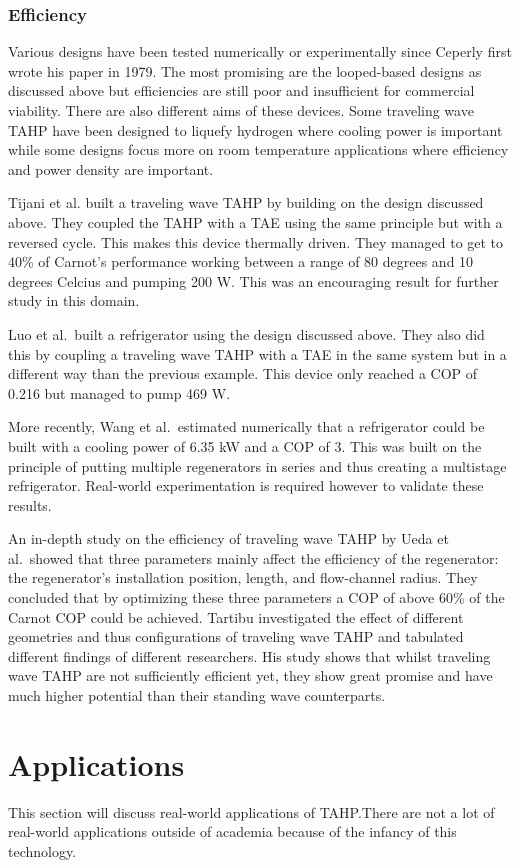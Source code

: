 \documentclass{article}
\newcommand{\newpara}
    {
      \bigbreak{}
      \noindent
    }
\begin{document}
\subsubsection{Efficiency}
Various designs have been tested numerically or experimentally since Ceperly first wrote his paper in 1979. The most promising are the looped-based designs as discussed above but efficiencies are still poor and insufficient for commercial viability. There are also different aims of these devices. Some traveling wave TAHP have been designed to liquefy hydrogen where cooling power is important while some designs focus more on room temperature applications where efficiency and power density are important\cite{WangRoomTemperature}.
\newpara{}
Tijani et al.\cite{spoelstraHighTemperature} built a traveling wave TAHP by building on the design discussed above. They coupled the TAHP with a TAE using the same principle but with a reversed cycle. This makes this device thermally driven. They managed to get to 40\% of Carnot's performance working between a range of 80 degrees and 10 degrees Celcius and pumping 200 W. This was an encouraging result for further study in this domain.
\newpara{}
Luo et al.\ built a refrigerator using the design discussed above\cite{LuoRefrigerator}. They also did this by coupling a traveling wave TAHP with a TAE in the same system but in a different way than the previous example. This device only reached a COP of 0.216 but managed to pump 469 W.
\newpara{}
More recently, Wang et al.\ estimated numerically that a refrigerator could be built with a cooling power of 6.35 kW and a COP of 3. This was built on the principle of putting multiple regenerators in series and thus creating a multistage refrigerator. Real-world experimentation is required however to validate these results.
\newpara{}
An in-depth study on the efficiency of traveling wave TAHP by Ueda et al.\ showed that three parameters mainly affect the efficiency of the regenerator: the regenerator's installation position, length, and flow-channel radius\cite{uedaOptimization}. They concluded that by optimizing these three parameters a COP of above 60\% of the Carnot COP could be achieved. Tartibu investigated the effect of different geometries and thus configurations of traveling wave TAHP and tabulated different findings of different researchers\cite{TARTIBU2019102}. His study shows that whilst traveling wave TAHP are not sufficiently efficient yet, they show great promise and have much higher potential than their standing wave counterparts.

\section{Applications}
This section will discuss real-world applications of TAHP.\@ There are not a lot of real-world applications outside of academia because of the infancy of this technology.
\end{document}
